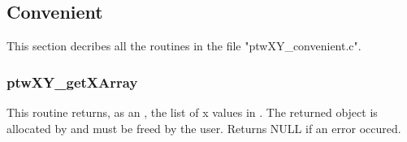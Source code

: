 \subsection{Convenient}
This section decribes all the routines in the file "ptwXY\_convenient.c".

\subsubsection{ptwXY\_getXArray}
This routine returns, as an , the list of x values in . The returned object is allocated
by  and must be freed by the user.
Returns NULL if an error occured.

